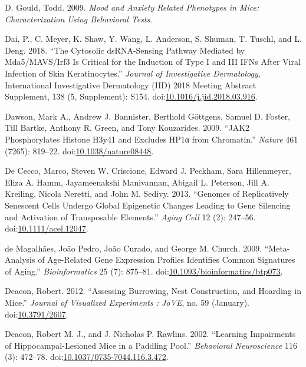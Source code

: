 \documentclass[onehalf,12pt]{beavtex}
\begin{document}
  \hypertarget{ref-Gouldbook2009}{}
  D. Gould, Todd. 2009. \emph{Mood and Anxiety Related Phenotypes in Mice:
  Characterization Using Behavioral Tests}.
  
  \hypertarget{ref-DaicytosolicdsRNAsensingpathway2018}{}
  Dai, P., C. Meyer, K. Shaw, Y. Wang, L. Anderson, S. Shuman, T. Tuschl,
  and L. Deng. 2018. ``The Cytosolic dsRNA-Sensing Pathway Mediated by
  Mda5/MAVS/Irf3 Is Critical for the Induction of Type I and III IFNs
  After Viral Infection of Skin Keratinocytes.'' \emph{Journal of
  Investigative Dermatology}, International Investigative Dermatology
  (IID) 2018 Meeting Abstract Supplement, 138 (5, Supplement): S154.
  doi:\href{https://doi.org/10.1016/j.jid.2018.03.916}{10.1016/j.jid.2018.03.916}.
  
  \hypertarget{ref-DawsonJAK2phosphorylateshistone2009}{}
  Dawson, Mark A., Andrew J. Bannister, Berthold Göttgens, Samuel D.
  Foster, Till Bartke, Anthony R. Green, and Tony Kouzarides. 2009. ``JAK2
  Phosphorylates Histone H3y41 and Excludes HP1α from Chromatin.''
  \emph{Nature} 461 (7265): 819--22.
  doi:\href{https://doi.org/10.1038/nature08448}{10.1038/nature08448}.
  
  \hypertarget{ref-DeCeccoGenomesreplicativelysenescent2013}{}
  De Cecco, Marco, Steven W. Criscione, Edward J. Peckham, Sara
  Hillenmeyer, Eliza A. Hamm, Jayameenakshi Manivannan, Abigail L.
  Peterson, Jill A. Kreiling, Nicola Neretti, and John M. Sedivy. 2013.
  ``Genomes of Replicatively Senescent Cells Undergo Global Epigenetic
  Changes Leading to Gene Silencing and Activation of Transposable
  Elements.'' \emph{Aging Cell} 12 (2): 247--56.
  doi:\href{https://doi.org/10.1111/acel.12047}{10.1111/acel.12047}.
  
  \hypertarget{ref-deMagalhaesMetaanalysisagerelatedgene2009}{}
  de Magalhães, João Pedro, João Curado, and George M. Church. 2009.
  ``Meta-Analysis of Age-Related Gene Expression Profiles Identifies
  Common Signatures of Aging.'' \emph{Bioinformatics} 25 (7): 875--81.
  doi:\href{https://doi.org/10.1093/bioinformatics/btp073}{10.1093/bioinformatics/btp073}.
  
  \hypertarget{ref-DeaconAssessingBurrowingNest2012}{}
  Deacon, Robert. 2012. ``Assessing Burrowing, Nest Construction, and
  Hoarding in Mice.'' \emph{Journal of Visualized Experiments : JoVE}, no.
  59 (January). doi:\href{https://doi.org/10.3791/2607}{10.3791/2607}.
  
  \hypertarget{ref-DeaconLearningimpairmentshippocampallesioned2002}{}
  Deacon, Robert M. J., and J. Nicholas P. Rawlins. 2002. ``Learning
  Impairments of Hippocampal-Lesioned Mice in a Paddling Pool.''
  \emph{Behavioral Neuroscience} 116 (3): 472--78.
  doi:\href{https://doi.org/10.1037/0735-7044.116.3.472}{10.1037/0735-7044.116.3.472}.
  
\end{document}
